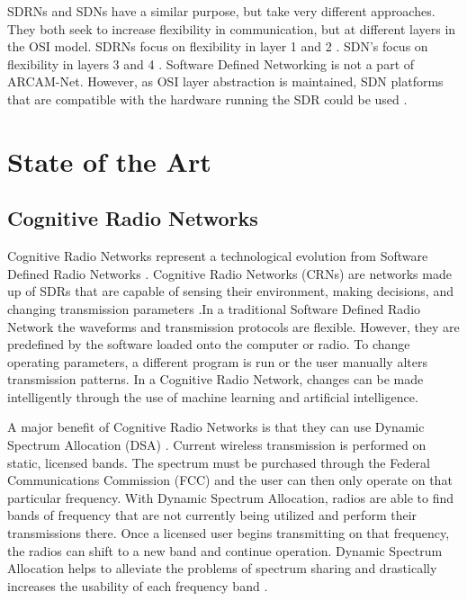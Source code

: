 SDRNs and SDNs have a similar purpose, but take very different approaches. They both seek to increase flexibility in communication, but at different layers in the OSI model. SDRNs focus on flexibility in layer 1 and 2 \cite{Akyildiz2007921}. SDN's focus on flexibility in layers 3 and 4 \cite{6994333}. Software Defined Networking is not a part of ARCAM-Net. However, as OSI layer abstraction is maintained, SDN platforms that are compatible with the hardware running the SDR could be used \cite{6933795}. 




\section{State of the Art}


\subsection{Cognitive Radio Networks}

Cognitive Radio Networks represent a technological evolution from Software Defined Radio Networks \cite{6599059}. Cognitive Radio Networks (CRNs) are networks made up of SDRs that are capable of sensing their environment, making decisions, and changing transmission parameters \cite{Akyildiz2007921}.In a traditional Software Defined Radio Network the waveforms and transmission protocols are flexible. However, they are predefined by the software loaded onto the computer or radio. To change operating parameters, a different program is run or the user manually alters transmission patterns. In a Cognitive Radio Network, changes can be made intelligently through the use of machine learning and artificial intelligence. 

A major benefit of Cognitive Radio Networks is that they can use Dynamic Spectrum Allocation (DSA) \cite{6892537}. Current wireless transmission is performed on static, licensed bands. The spectrum must be purchased through the Federal Communications Commission (FCC) and the user can then only operate on that particular frequency. With Dynamic Spectrum Allocation, radios are able to find bands of frequency that are not currently being utilized and perform their transmissions there. Once a licensed user begins transmitting on that frequency, the radios can shift to a new band and continue operation. Dynamic Spectrum Allocation helps to alleviate the problems of spectrum sharing and drastically increases the usability of each frequency band \cite{6599059}. 

